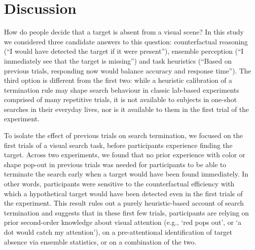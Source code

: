 \documentclass[12pt,twoside]{reedthesis}
\begin{document}
\hypertarget{discussion}{%
\section{Discussion}\label{discussion}}

How do people decide that a target is absent from a visual scene? In this study we considered three candidate answers to this question: counterfactual reasoning (``I would have detected the target if it were present''), ensemble perception (``I immediately see that the target is missing'') and task heuristics (``Based on previous trials, responding now would balance accuracy and response time''). The third option is different from the first two: while a heuristic calibration of a termination rule may shape search behaviour in classic lab-based experiments comprised of many repetitive trials, it is not available to subjects in one-shot searches in their everyday lives, nor is it available to them in the first trial of the experiment.

To isolate the effect of previous trials on search termination, we focused on the first trials of a visual search task, before participants experience finding the target. Across two experiments, we found that no prior experience with color or shape pop-out in previous trials was needed for participants to be able to terminate the search early when a target would have been found immediately. In other words, participants were sensitive to the counterfactual efficiency with which a hypothetical target would have been detected even in the first trials of the experiment. This result rules out a purely heuristic-based account of search termination and suggests that in these first few trials, participants are relying on prior second-order knowledge about visual attention (e.g., `red pops out', or `a dot would catch my attention'), on a pre-attentional identification of target absence via ensemble statistics, or on a combination of the two.
\end{document}
